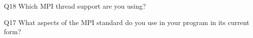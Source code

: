 \begin{description}%
\item{Q18} Which MPI thread support are you using?%
\item{Q17} What aspects of the MPI standard do you use in your program in its current form?%
\end{description}%
